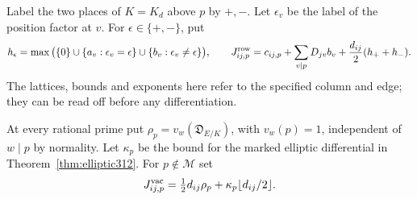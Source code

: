 \documentclass[a4paper,11pt]{article}
\theoremstyle{definition}
\theoremstyle{remark}
\numberwithin{equation}{section}
\begin{document}
Label the two places of \(K=K_d\) above \(p\) by \(+,-\).
Let \(\epsilon_v\) be the label of the position factor at \(v\).
For \(\epsilon\in\{+,-\}\), put
\[
 h_\epsilon=
 \max\big(\{0\}\cup\{a_v:\epsilon_v=\epsilon\}
                 \cup\{b_v:\epsilon_v\ne\epsilon\}\big),
 \qquad
 J_{ij,p}^{\rm row}
  =c_{ij,p}+\sum_{v\mid p}D_{jv}b_v
                 +\frac{d_{ij}}2(h_++h_-).
\]
The lattices, bounds and exponents here refer to the specified
column and edge; they can be read off before any differentiation.

At every rational prime put
\(\rho_p=v_w(\mathfrak D_{E/K})\), with \(v_w(p)=1\),
independent of \(w\mid p\) by normality. Let \(\kappa_p\) be
the bound for the marked elliptic differential in
Theorem~\ref{thm:elliptic312}. For \(p\notin\mathcal M\) set
\[
      J_{ij,p}^{\rm vac}=
        \tfrac12 d_{ij}\rho_p+
                      \kappa_p\lfloor d_{ij}/2\rfloor .
\]
\end{document}
